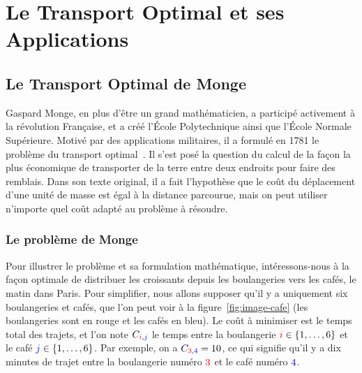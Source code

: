 

\newcommand{\Blu}[1]{{\color{blue}#1}}
\newcommand{\Red}[1]{{\color{red}#1}}
\newcommand{\iC}{\Red{i}}
\newcommand{\jC}{\Blu{j}}
\newcommand{\aC}{\Red{a}}
\newcommand{\bC}{\Blu{b}}


\ifdefined\otarticle
\newcommand{\myparagraph}[1]{\subsection{#1}}
\else
\newcommand{\myparagraph}[1]{\paragraph{#1}}
\chapter{Le Transport Optimal et ses Applications}
\fi

\label{chap-ot}


\section{Le Transport Optimal de Monge}

Gaspard Monge, en plus d'être un grand mathématicien, a participé activement à la révolution Française, et a créé l'\'Ecole Polytechnique ainsi que l'\'Ecole Normale Supérieure. Motivé par des applications militaires, il a formulé en 1781 le problème du transport optimal~\cite{Monge1781}. Il s'est posé la question du calcul de la façon la plus économique de transporter de la terre entre deux endroits pour faire des remblais. Dans son texte original, il a fait l'hypothèse que le coût du déplacement d'une unité de masse est égal à la distance parcourue, mais on peut utiliser n'importe quel coût adapté au problème à résoudre. 

\myparagraph{Le problème de Monge}

Pour illustrer le problème et sa formulation mathématique, intéressons-nous à la façon optimale de distribuer les croissants depuis les boulangeries vers les cafés, le matin dans Paris. Pour simplifier, nous allons supposer qu'il y a uniquement six boulangeries et cafés, que l'on peut voir à la figure~\ref{fig:image-cafe} (les boulangeries sont en \Red{rouge} et les cafés en \Blu{bleu}). Le coût à minimiser est le temps total des trajets, et l'on note $C_{\iC,\jC}$ le temps entre la boulangerie $\iC \in \{1,\ldots,6\}$  et le café $\jC \in \{1,\ldots,6\}$. Par exemple, on a $C_{\Red{3},\Blu{4}}=10$, ce qui signifie qu'il y a dix minutes de trajet entre la boulangerie numéro $\Red{3}$ et le café numéro $\Blu{4}$. 


